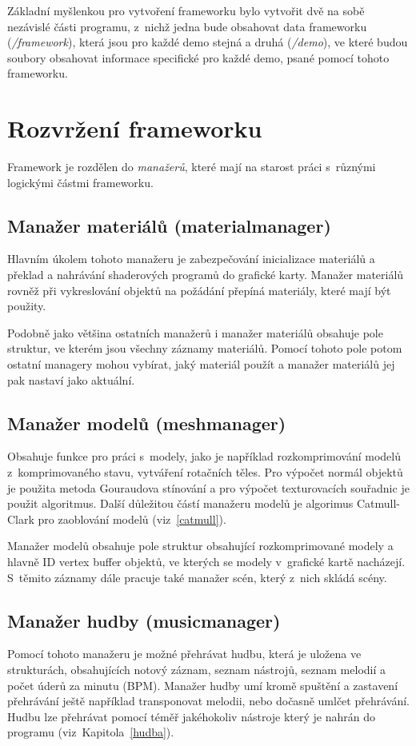 Základní myšlenkou pro vytvoření frameworku bylo vytvořit dvě na sobě nezávislé části programu, z~nichž jedna bude obsahovat data frameworku (\emph{/framework}), která jsou pro každé demo stejná a druhá (\emph{/demo}), ve které budou soubory obsahovat informace specifické pro každé demo, psané pomocí tohoto frameworku.

\section{Rozvržení frameworku}
Framework je rozdělen do \emph{manažerů}, které mají na starost práci s~různými logickými částmi frameworku.
\subsection{Manažer materiálů (materialmanager)}
Hlavním úkolem tohoto manažeru je zabezpečování inicializace materiálů a překlad a nahrávání shaderových programů do grafické karty.
Manažer materiálů rovněž při vykreslování objektů na požádání přepíná materiály, které mají být použity.

Podobně jako většina ostatních manažerů i manažer materiálů obsahuje pole struktur, ve kterém jsou všechny záznamy materiálů.
Pomocí tohoto pole potom ostatní managery mohou vybírat, jaký materiál použít a manažer materiálů jej pak nastaví jako aktuální.

\subsection{Manažer modelů (meshmanager)}
Obsahuje funkce pro práci s~modely, jako je například rozkomprimování modelů z~komprimovaného stavu, vytváření rotačních těles.
Pro výpočet normál objektů je použita metoda Gouraudova stínování \cite{gouraud} a pro výpočet texturovacích souřadnic je použit algoritmus.
Další důležitou částí manažeru modelů je algorimus Catmull-Clark pro zaoblování modelů (viz~\ref{catmull}).

Manažer modelů obsahuje pole struktur obsahující rozkomprimované modely a hlavně ID vertex buffer objektů, ve kterých se modely v~grafické kartě nacházejí.
S~těmito záznamy dále pracuje také manažer scén, který z~nich skládá scény.

\subsection{Manažer hudby (musicmanager)}
Pomocí tohoto manažeru je možné přehrávat hudbu, která je uložena ve strukturách, obsahujících notový záznam, seznam nástrojů, seznam melodií a počet úderů za minutu (BPM).
Manažer hudby umí kromě spuštění a zastavení přehrávání ještě například transponovat melodii, nebo dočasně umlčet přehrávání.
Hudbu lze přehrávat pomocí téměř jakéhokoliv nástroje který je nahrán do programu (viz~Kapitola~\ref{hudba}).

